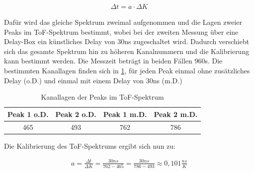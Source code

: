 \begin{align}
\Delta t = a \cdot \Delta K
\end{align}

Dafür wird das gleiche Spektrum zweimal aufgenommen und die Lagen zweier Peaks im ToF-Spektrum bestimmt, wobei bei der zweiten Messung über eine Delay-Box ein künstliches Delay von 30ns zugeschaltet wird. Dadurch verschiebt sich das gesamte Spektrum hin zu höheren Kanalnummern und die Kalibrierung kann bestimmt werden. Die Messzeit beträgt in beiden Fällen 960s. Die bestimmten Kanallagen finden sich in \ref{ToF}, für jeden Peak einmal ohne zusätzliches Delay  (o.D.) und einmal mit einem Delay von 30ns (m.D.)

\begin{table}[h]
	\caption{Kanallagen der Peaks im ToF-Spektrum}
	\begin{tabular}{|c|c|c|c|}
	\hline
	 Peak 1 o.D. & Peak 2 o.D. & Peak 1 m.D. & Peak 2 m.D.\\ \hline
	 465 & 493 & 762 & 786\\ \hline
	\end{tabular}
\label{ToF}
\end{table}

Die Kalibrierung des ToF-Spektrums ergibt sich nun zu:

\begin{align}
a=\frac{\Delta t}{\Delta K}=\frac{30ns}{762 - 465} = \frac{30ns}{786 - 493} \approx 0,101 \frac{ns}{K}
\end{align}



 